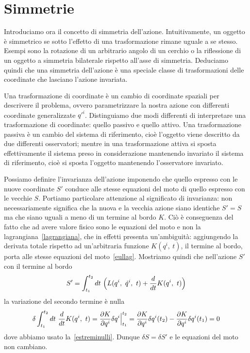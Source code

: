 \section{Simmetrie}
    
    Introduciamo ora il concetto di simmetria dell'azione. Intuitivamente, un oggetto è simmetrico se sotto l'effetto di una trasformazione rimane uguale a se stesso. Esempi sono la rotazione di un arbitrario angolo di un cerchio o la riflessione di un oggetto a simmetria bilaterale rispetto all'asse di simmetria. Deduciamo quindi che una simmetria dell'azione è una speciale classe di trasformazioni delle coordinate che lasciano l'azione invariata. 
    
    Una trasformazione di coordinate è un cambio di coordinate spaziali per descrivere il problema, ovvero parametrizzare la nostra azione con differenti coordinate generalizzate $q'^i$. Distinguiamo due modi differenti di interpretare una trasformazione di coordinate: quello passivo e quello attivo. Una trasformazione passiva è un cambio del sistema di riferimento, cioè l'oggetto viene descritto da due differenti osservatori; mentre in una trasformazione attiva si sposta effettivamente il sistema preso in considerazione mantenendo invariato il sistema di riferimento, cioè si sposta l'oggetto mantenendo l'osservatore invariato. 
    
    Possiamo definire l'invarianza dell'azione imponendo che quello espresso con le nuove coordinate $S'$ conduce alle stesse equazioni del moto di quello espresso con le vecchie $S$. Portiamo particolare attenzione al significato di invarianza: non necessariamente significa che la nuova e la vecchia azione siano identiche $S' = S$ ma che siano uguali a meno di un termine al bordo $K$. Ciò è conseguenza del fatto che ad avere valore fisico sono le equazioni del moto e non la lagrangiana~\eqref{lagrangiana}, che in effetti presenta un'ambiguità: aggiungendo la derivata totale rispetto ad un'arbitraria funzione $K(q^i, ~ t)$, il termine al bordo, porta alle stesse equazioni del moto~\eqref{eullag}. Mostriamo quindi che nell'azione $S'$ con il termine al bordo
    \begin{equation*}
        S' = \int_{t_1}^{t_2}dt~ \Big ( L(q^i, ~ \dot q^i, ~t) + \frac{d}{dt} K(q^i, ~t) \Big)
    \end{equation*}
    la variazione del secondo termine è nulla
    \begin{equation*}
        \delta \int_{t_1}^{t_2}dt~ \frac{d}{dt} K(q^i, ~t) = \frac{\partial K}{\partial q^i} \delta q^i \Big \vert_{t_1}^{t_2} = \frac{\partial K}{\partial q^i} \delta q^i (t_2) - \frac{\partial K}{\partial q^i} \delta q^i (t_1) = 0
    \end{equation*} 
    dove abbiamo usato la~\eqref{estreminulli}. Dunque $\delta S = \delta S'$ e le equazioni del moto non cambiano.

